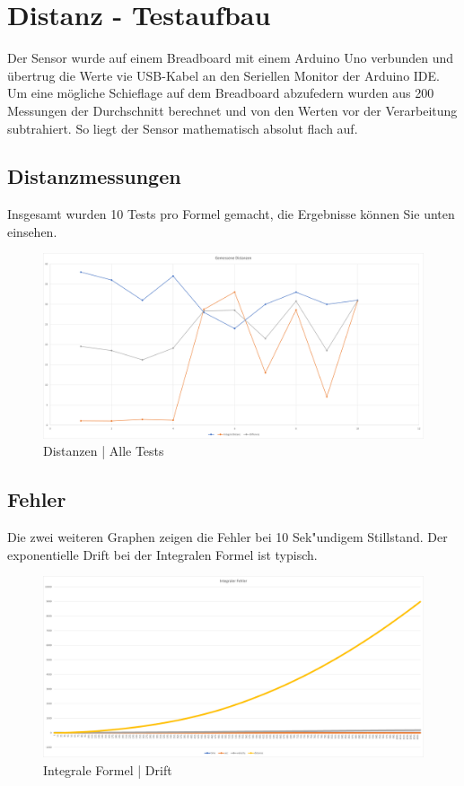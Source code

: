 \section{Distanz - Testaufbau}
Der Sensor wurde auf einem Breadboard mit einem Arduino Uno verbunden und übertrug die Werte
vie USB-Kabel an den Seriellen Monitor der Arduino IDE. Um eine mögliche Schieflage auf dem
Breadboard abzufedern wurden aus 200 Messungen der Durchschnitt berechnet und von den Werten vor
der Verarbeitung subtrahiert. So liegt der Sensor mathematisch absolut flach auf. \\

\subsection{Distanzmessungen}
Insgesamt wurden 10 Tests pro Formel gemacht, die Ergebnisse können Sie unten einsehen.\\

\begin{figure} [h]
    \centering
    \includegraphics[width = 15cm]{Bilder/_DistanzVergleich}
    \caption{Distanzen | Alle Tests}
    \end{figure}

\subsection{Fehler}
Die zwei weiteren Graphen zeigen die Fehler bei 10 Sek"undigem Stillstand. Der exponentielle Drift 
bei der Integralen Formel ist typisch.

\begin{figure} [h]
    \centering
    \includegraphics[width = 15cm]{Bilder/_integralDistance001}
    \caption{Integrale Formel | Drift}
    \end{figure}

